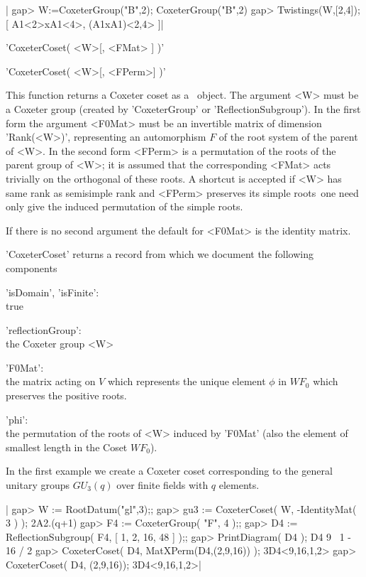 |    gap> W:=CoxeterGroup("B",2);
    CoxeterGroup("B",2)
    gap> Twistings(W,[2,4]);
    [ A1<2>xA1<4>, (A1xA1)<2,4> ]|


'CoxeterCoset( <W>[, <FMat> ] )'

'CoxeterCoset( <W>[, <FPerm>] )'

This  function returns a Coxeter coset as  a \GAP\ object. The argument <W>
must be a Coxeter group (created by 'CoxeterGroup' or
'ReflectionSubgroup').  In the first  form the argument  <F0Mat> must be an
invertible  matrix of  dimension 'Rank(<W>)',  representing an automorphism
$F$  of the root system of the parent of <W>. In the second form <FPerm> is
a  permutation of the roots of the parent  group of <W>; it is assumed that
the corresponding <FMat> acts trivially on the orthogonal of these roots. A
shortcut  is accepted if <W>  has same rank as  semisimple rank and <FPerm>
preserves its simple roots\:\ one need only give the induced permutation of
the simple roots.

If  there is  no second  argument the  default for  <F0Mat> is the identity
matrix.

'CoxeterCoset' returns a record  from   which we document the   following
components\:

'isDomain', 'isFinite':\\
        true

'reflectionGroup':\\
        the Coxeter group <W>

'F0Mat':\\
        the matrix acting on $V$ which represents the unique element $\phi$
in $WF_0$ which preserves the positive roots.

'phi':\\
        the permutation of the roots of <W> induced by 'F0Mat'
        (also the element of smallest length in the Coset $WF_0$).

In  the  first example  we create a  Coxeter  coset corresponding  to the
general unitary groups $GU_3(q)$ over finite fields with $q$ elements.

|    gap> W := RootDatum("gl",3);;
    gap> gu3 := CoxeterCoset( W, -IdentityMat( 3 ) );
    2A2.(q+1)
    gap> F4 := CoxeterGroup( "F", 4 );;
    gap> D4 := ReflectionSubgroup( F4, [ 1, 2, 16, 48 ] );;
    gap> PrintDiagram( D4 );
    D4 9
        \
         1 - 16
        /
       2
    gap> CoxeterCoset( D4, MatXPerm(D4,(2,9,16)) );
    3D4<9,16,1,2>
    gap> CoxeterCoset( D4, (2,9,16));
    3D4<9,16,1,2>|

